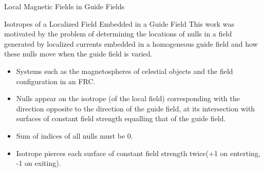 \documentclass[final]{beamer}
\newlength{\onecolwid}
\begin{document}
\begin{frame}[t]
\begin{columns}[t]
\begin{column}{\onecolwid}
\begin{block}{\huge{Local Magnetic Fields in Guide Fields}}
\begin{block}{Isotropes of a Localized Field Embedded in a Guide Field}
  This work was motivated by the problem of determining the locations of nulls in a field generated by
  localized currents embedded in a homogeneous guide field
  and how these nulls move when the guide field is varied.
  \begin{itemize}
    \item Systems such as the magnetospheres of celestial objects and the field configuration in an FRC.
    \item Nulls appear on the isotrope (of the local field) corresponding with the direction opposite to the
      direction of the guide field,
      at its intersection with surfaces of constant field strength equalling that of the guide field.
    \item Sum of indices of all nulls must be 0.
    \item Isotrope pierces each surface of constant field strength twice(+1 on enterting, -1 on exiting).
   \end{itemize}
    

\end{block}
\end{block}
\end{column}
\end{columns}
\end{frame}
\end{document}
